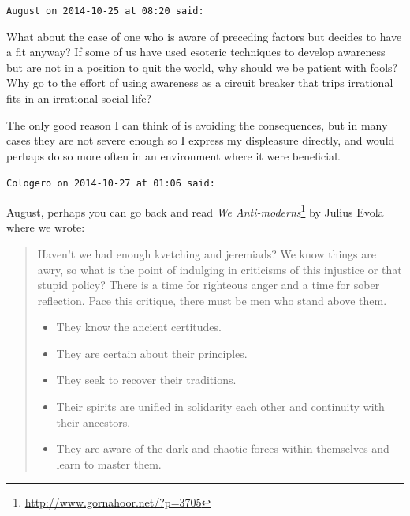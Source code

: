 \begin{footnotesize}
\begin{sffamily}
\texttt{August on 2014-10-25 at 08:20 said:}

What about the case of one who is aware of preceding factors but decides to have a fit anyway? If some of us have used esoteric techniques to develop awareness but are not in a position to quit the world, why should we be patient with fools? Why go to the effort of using awareness as a circuit breaker that trips irrational fits in an irrational social life?

The only good reason I can think of is avoiding the consequences, but in many cases they are not severe enough so I express my displeasure directly, and would perhaps do so more often in an environment where it were beneficial.

\hfill

\texttt{Cologero on 2014-10-27 at 01:06 said:}

August, perhaps you can go back and read \textit{We Anti-moderns}\footnote{\url{http://www.gornahoor.net/?p=3705}} by Julius Evola where we wrote:

\begin{quote}\footnotesize

Haven't we had enough kvetching and jeremiads? We know things are awry, so what is the point of indulging in criticisms of this injustice or that stupid policy? There is a time for righteous anger and a time for sober reflection. Pace this critique, there must be men who stand above them.

\begin{itemize}


\item They know the ancient certitudes.

\item They are certain about their principles.

\item They seek to recover their traditions.

\item Their spirits are unified in solidarity each other and continuity with their ancestors.

\item They are aware of the dark and chaotic forces within themselves and learn to master them.
\end{itemize}

\end{quote}



\end{sffamily}
\end{footnotesize}
